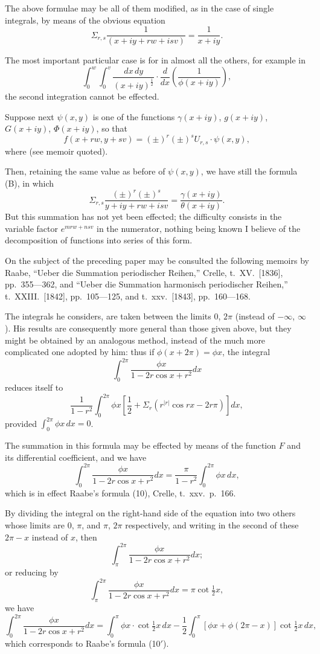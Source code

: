 \documentclass[11pt,a4paper]{article}
\theoremstyle{plain}
\begin{document}
The above formulae may be all of them modified, as in the case of single integrals, by means of the obvious equation
\[\Sigma_{r,s} \frac{1}{(x+iy+rw+isv)} = \frac{1}{x+iy}.\]

The most important particular case is for in almost all the others, for example in
\[\int_0^w\!\!\int_0^v \frac{dx \, dy}{(x+iy)^{\frac{1}{2}}} \cdot \frac{d}{dx}\left(\frac{1}{\phi(x+iy)}\right),\]
the second integration cannot be effected.

Suppose next $\psi(x,y)$ is one of the functions $\gamma(x+iy)$, $g(x+iy)$, $G(x+iy)$, $\Phi(x+iy)$, so that
\[f(x+rw, y+sv) = (\pm)^r (\pm)^s U_{r,s} \cdot \psi(x,y),\]
where (see memoir quoted).

Then, retaining the same value as before of $\psi(x,y)$, we have still the formula (B), in which
\[\Sigma_{r,s} \frac{(\pm)^r (\pm)^s}{y+iy+rw+isv} = \frac{\gamma(x+iy)}{\theta(x+iy)}.\]
But this summation has not yet been effected; the difficulty consists in the variable factor $e^{mrw+nsv}$ in the numerator, nothing being known I believe of the decomposition of functions into series of this form.

On the subject of the preceding paper may be consulted the following memoirs by Raabe, ``Ueber die Summation periodischer Reihen,'' Crelle, t.\ XV.\ [1836], pp.\ 355---362, and ``Ueber die Summation harmonisch periodischer Reihen,'' t.\ XXIII.\ [1842], pp.\ 105---125, and t.\ xxv.\ [1843], pp.\ 160---168.

The integrals he considers, are taken between the limits $0$, $2\pi$ (instead of $-\infty$, $\infty$). His results are consequently more general than those given above, but they might be obtained by an analogous method, instead of the much more complicated one adopted by him: thus if $\phi(x+2\pi) = \phi x$, the integral
\[\int_0^{2\pi} \frac{\phi x}{1-2r\cos x + r^2} dx\]
reduces itself to
\[\frac{1}{1-r^2} \int_0^{2\pi} \phi x \left[\frac{1}{2} + \Sigma_r (r^{|r|} \cos rx - 2r\pi)\right] dx,\]
provided $\int_0^{2\pi} \phi x \, dx = 0$.

The summation in this formula may be effected by means of the function $F$ and its differential coefficient, and we have
\[\int_0^{2\pi} \frac{\phi x}{1-2r\cos x + r^2} dx = \frac{\pi}{1-r^2} \int_0^{2\pi} \phi x \, dx,\]
which is in effect Raabe's formula (10), Crelle, t.\ xxv.\ p.\ 166.

By dividing the integral on the right-hand side of the equation into two others whose limits are $0$, $\pi$, and $\pi$, $2\pi$ respectively, and writing in the second of these $2\pi - x$ instead of $x$, then
\[\int_{\pi}^{2\pi} \frac{\phi x}{1-2r\cos x + r^2} dx;\]
or reducing by
\[\int_{\pi}^{2\pi} \frac{\phi x}{1-2r\cos x + r^2} dx = \pi \cot \tfrac{1}{2}x,\]
we have
\[\int_0^{2\pi} \frac{\phi x}{1-2r\cos x + r^2} dx = \int_0^{\pi} \phi x \cdot \cot \tfrac{1}{2}x \, dx - \frac{1}{2} \int_0^{\pi} [\phi x + \phi(2\pi - x)] \cot \tfrac{1}{2}x \, dx,\]
which corresponds to Raabe's formula (10$'$).
\end{document}

